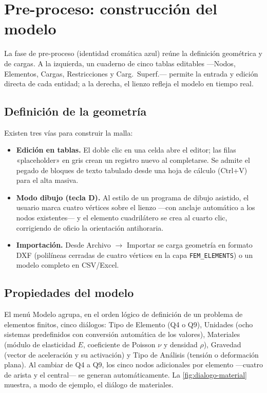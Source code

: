 \section{Pre-proceso: construcción del modelo}

La fase de pre-proceso (identidad cromática azul) reúne la definición geométrica y de cargas. A la izquierda, un cuaderno de cinco tablas editables ---\textsf{Nodos}, \textsf{Elementos}, \textsf{Cargas}, \textsf{Restricciones} y \textsf{Carg.\ Superf.}--- permite la entrada y edición directa de cada entidad; a la derecha, el lienzo refleja el modelo en tiempo real.

\subsection{Definición de la geometría}

Existen tres vías para construir la malla:

\begin{itemize}
  \item \textbf{Edición en tablas.} El doble clic en una celda abre el editor; las filas «placeholder» en gris crean un registro nuevo al completarse. Se admite el pegado de bloques de texto tabulado desde una hoja de cálculo (Ctrl+V) para el alta masiva.
  \item \textbf{Modo dibujo (tecla D).} Al estilo de un programa de dibujo asistido, el usuario marca cuatro vértices sobre el lienzo ---con anclaje automático a los nodos existentes--- y el elemento cuadrilátero se crea al cuarto clic, corrigiendo de oficio la orientación antihoraria.
  \item \textbf{Importación.} Desde \textsf{Archivo} $\rightarrow$ \textsf{Importar} se carga geometría en formato DXF (polilíneas cerradas de cuatro vértices en la capa \texttt{FEM\_ELEMENTS}) o un modelo completo en CSV/Excel.
\end{itemize}

\subsection{Propiedades del modelo}

El menú \textsf{Modelo} agrupa, en el orden lógico de definición de un problema de elementos finitos, cinco diálogos: \textsf{Tipo de Elemento} (Q4 o Q9), \textsf{Unidades} (ocho sistemas predefinidos con conversión automática de los valores), \textsf{Materiales} (módulo de elasticidad $E$, coeficiente de Poisson $\nu$ y densidad $\rho$), \textsf{Gravedad} (vector de aceleración y su activación) y \textsf{Tipo de Análisis} (tensión o deformación plana). Al cambiar de Q4 a Q9, los cinco nodos adicionales por elemento ---cuatro de arista y el central--- se generan automáticamente. La \autoref{fig:dialogo-material} muestra, a modo de ejemplo, el diálogo de materiales.

